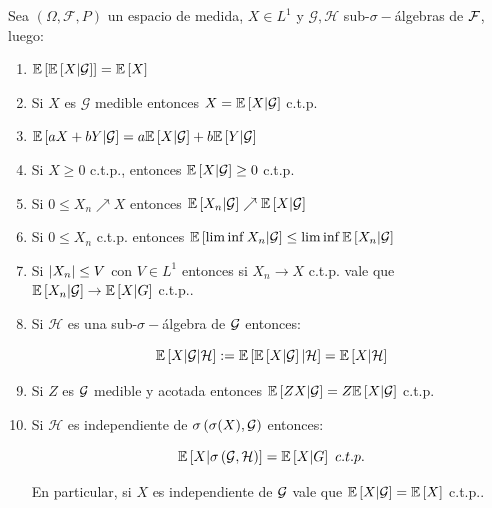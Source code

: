 \begin{theorem}
	\label{theorem: Propiedades de esperanza condicional}
	Sea $\left(\Omega, \mathcal{F}, P\right)$ un espacio de medida, $X \in L^1$ y $\mathcal{G}, \mathcal{H}$ sub-$\sigma-$\'algebras de $\mathcal{F}$, luego:
	
	\begin{enumerate}
		\item $\mathbb{E} \left[\mathbb{E} \left[X \vert \mathcal{G}\right]\right] = \mathbb{E} \left[X\right]$
		\item Si $X$ es $\mathcal{G}$ medible entonces $X = \mathbb{E} \left[X \vert \mathcal{G}\right] $ c.t.p.
		\item $\mathbb{E} \left[aX + bY \vert \mathcal{G}\right] = a\mathbb{E} \left[X \vert \mathcal{G}\right] + b \mathbb{E} \left[Y \vert \mathcal{G}\right]$
		\item Si $X \geq 0$ c.t.p., entonces $\mathbb{E} \left[X \vert \mathcal{G}\right] \geq 0$ c.t.p.
		\item Si $0 \leq X_n \nearrow X$ entonces $\mathbb{E} \left[X_n \vert \mathcal{G}\right] \nearrow \mathbb{E} \left[X \vert \mathcal{G}\right]$
		\item Si $0 \leq X_n$ c.t.p. entonces $\mathbb{E} \left[\liminf X_n \vert \mathcal{G}\right] \leq \liminf \mathbb{E} \left[X_n \vert \mathcal{G}\right]$
		\item Si $\left\lvert X_n\right\rvert \leq V$ con $V \in L^1$ entonces si $X_n \rightarrow X$ c.t.p. vale que $\mathbb{E} \left[X_n \vert \mathcal{G}\right] \rightarrow \mathbb{E} \left[X \vert G\right]$ c.t.p..
		\item Si $\mathcal{H}$ es una sub-$\sigma-$\'algebra de $\mathcal{G}$ entonces:
		
		\begin{equation*}
			\mathbb{E} \left[X \vert \mathcal{G} \vert \mathcal{H}\right] := \mathbb{E} \left[\mathbb{E} \left[X \vert \mathcal{G}\right] \vert \mathcal{H}\right] = \mathbb{E} \left[X \vert \mathcal{H}\right]
		\end{equation*}
		
		\item Si $Z$ es $\mathcal{G}$ medible y acotada entonces $\mathbb{E} \left[ZX \vert \mathcal{G}\right] = Z \mathbb{E} \left[X \vert \mathcal{G}\right]$ c.t.p.
		\item Si $\mathcal{H}$ es independiente de $\sigma\left(\sigma(X), \mathcal{G}\right)$ entonces:
		
		\begin{equation*}
			\conditionalExpectation{X}{\sigma \left(\G, \mathcal{H}\right)} = \conditionalExpectation{X}{G} \ c.t.p.
		\end{equation*}
		
		En particular, si $X$ es independiente de $\mathcal{G}$ vale que $\mathbb{E} \left[X \vert \mathcal{G}\right] = \mathbb{E} \left[X\right]$ c.t.p.. 
		
	\end{enumerate}
	
\end{theorem}

